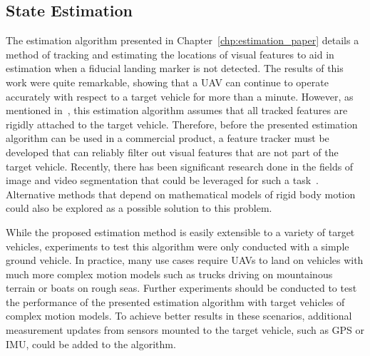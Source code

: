 \subsection{State Estimation}
The estimation algorithm presented in Chapter~\ref{chp:estimation_paper} details
a method of tracking and estimating the locations of visual features 
to aid in estimation when a fiducial landing marker is
not detected. The results of this work were quite remarkable, showing that a UAV
can continue to operate accurately with respect to a target vehicle for more
than a minute. However, as mentioned in~, this estimation algorithm
assumes that all tracked features are rigidly attached to the target vehicle.
Therefore, before the presented estimation algorithm can be used in a commercial
product, a feature tracker must be developed that can reliably filter out visual
features that are not part of the target vehicle.
Recently, there has been significant research done
in the fields of image and video segmentation that could be leveraged for such a
task~\cite{chen2018encoder}. Alternative methods that depend on
mathematical models of rigid body motion could also be explored as a possible
solution to this problem.

While the proposed estimation method is easily extensible to a variety of
target vehicles, experiments to test this algorithm were only conducted
with a simple ground vehicle.
In practice, many use cases require UAVs to land on
vehicles with much more complex motion models such as trucks driving on
mountainous terrain or boats on rough seas.
Further experiments should be conducted to test the performance of the presented
estimation algorithm with target vehicles of complex motion models.
To achieve better results in these scenarios, additional measurement updates
from sensors mounted to the target vehicle, such as GPS or IMU,
could be added  to the algorithm.

